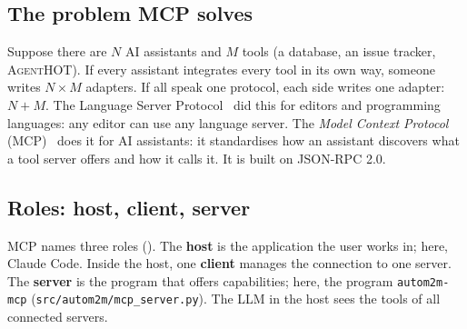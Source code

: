 \documentclass[10pt,a4paper]{article}
\newcommand{\tool}{\textsc{AgentHOT}}
\newcommand{\cc}{Claude Code}
\newcommand{\code}[1]{\texttt{#1}}
\newcommand{\file}[1]{\texttt{#1}}
\begin{document}
\subsection{The problem MCP solves}

Suppose there are $N$ AI assistants and $M$ tools (a database, an issue
tracker, \tool{}). If every assistant integrates every tool in its own way,
someone writes $N\times M$ adapters. If all speak one protocol, each side
writes one adapter: $N+M$. The Language Server Protocol~\cite{lsp} did this
for editors and programming languages: any editor can use any language
server. The \emph{Model Context Protocol}
(MCP)~\cite{mcp2024,mcpspec20250618} does it for AI assistants: it
standardises how an assistant discovers what a tool server offers and how it
calls it. It is built on JSON-RPC 2.0.

\subsection{Roles: host, client, server}

MCP names three roles (). The \textbf{host} is the
application the user works in; here, \cc{}. Inside the host, one
\textbf{client} manages the connection to one server. The \textbf{server}
is the program that offers capabilities; here, the program
\code{autom2m-mcp} (\file{src/autom2m/mcp_server.py}). The LLM in the host
sees the tools of all connected servers.
\end{document}

